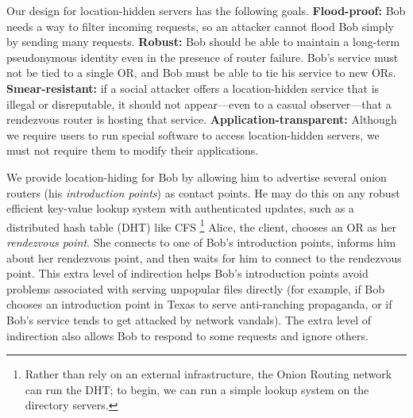 \documentclass[times,10pt,twocolumn]{article}
\begin{document}
Our design for location-hidden servers has the following goals.
\textbf{Flood-proof:} Bob needs a way to filter incoming requests,
so an attacker cannot flood Bob simply by sending many requests.
\textbf{Robust:} Bob should be able to maintain a long-term pseudonymous
identity even in the presence of router failure. Bob's service must
not be tied to a single OR, and Bob must be able to tie his service
to new ORs. \textbf{Smear-resistant:} if a social attacker offers a
location-hidden service that is illegal or disreputable, it should not
appear---even to a casual observer---that a rendezvous router is hosting
that service. \textbf{Application-transparent:} Although we require users
to run special software to access location-hidden servers, we must not
require them to modify their applications.

We provide location-hiding for Bob by allowing him to advertise
several onion routers (his \emph{introduction points}) as contact
points. He may do this on any robust efficient
key-value lookup system with authenticated updates, such as a
distributed hash table (DHT) like CFS \cite{cfs:sosp01}\footnote{
Rather than rely on an external infrastructure, the Onion Routing network
can run the DHT; to begin, we can run a simple lookup system on the
directory servers.} Alice, the client, chooses an OR as her
\emph{rendezvous point}. She connects to one of Bob's introduction
points, informs him about her rendezvous point, and then waits for him
to connect to the rendezvous point. This extra level of indirection
helps Bob's introduction points avoid problems associated with serving
unpopular files directly (for example, if Bob chooses
an introduction point in Texas to serve anti-ranching propaganda,
or if Bob's service tends to get attacked by network vandals).
The extra level of indirection also allows Bob to respond to some requests
and ignore others.
\end{document}
